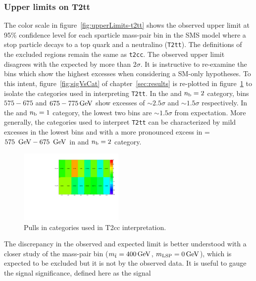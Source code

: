 \subsubsection{Upper limits on T2tt}

The color scale in figure~\ref{fig:upperLimits-t2tt} shows the observed upper 
limit at 95\% confidence level for each sparticle mass-pair bin in the SMS 
model where a stop particle decays to a top quark and a neutralino (\texttt{T2tt}). 
The definitions of the excluded regions remain the same as \texttt{t2cc}.
The observed upper limit disagrees with the expected by more than $2\sigma$.
It is instructive to re-examine the \scalht bins which show the highest excesses 
when considering a SM-only hypotheses. To this intent, figure~\ref{fig:sigVsCat} of 
chapter~\ref{sec:results} is re-plotted in figure~\ref{fig:sigVsCat2} to 
isolate the categories used in interpreting \texttt{T2tt}. In the \njethigh 
and $n_{\text{b}} = 2$ category, \scalht bins $575-675$ and $675-775\,\text{Ge\hspace{-.08em}V}$ show excesses of 
$\sim\!\!2.5\sigma$ and $\sim\!\!1.5\sigma$ respectively. In the \njethigh and 
$n_{\text{b}} = 1$ category, the lowest two \scalht bins are $\sim\!\!1.5\sigma$ 
from expectation. More generally, the categories used to interpret \texttt{T2tt} can be
characterized by mild excesses in the lowest \scalht bins and with
a more pronounced excess in \scalht = $575~\,\text{Ge\hspace{-.08em}V}-675~\,\text{Ge\hspace{-.08em}V}$ in \njethigh 
and $n_{\text{b}} = 2$ category. 
\begin{figure}[h!]
  \begin{center}
      \includegraphics[width=0.45\textwidth, trim=0 0 0 30, clip=true]{figures/fit/v22/significances_catVsHt_2}
    \caption{Pulls in categories used in T2cc interpretation.\label{fig:sigVsCat2}}
  \end{center}
\end{figure}
The discrepancy in the observed and expected 
limit is better understood with a closer study of the mass-pair
bin ($m_{\tilde{\rm t}} = 400\,\text{Ge\hspace{-.08em}V}$, $m_{\text{LSP}} = 0\,\text{Ge\hspace{-.08em}V}$), which is 
expected to be excluded but it is not by the observed data. 
It is useful to gauge the signal significance, defined here as the signal 
